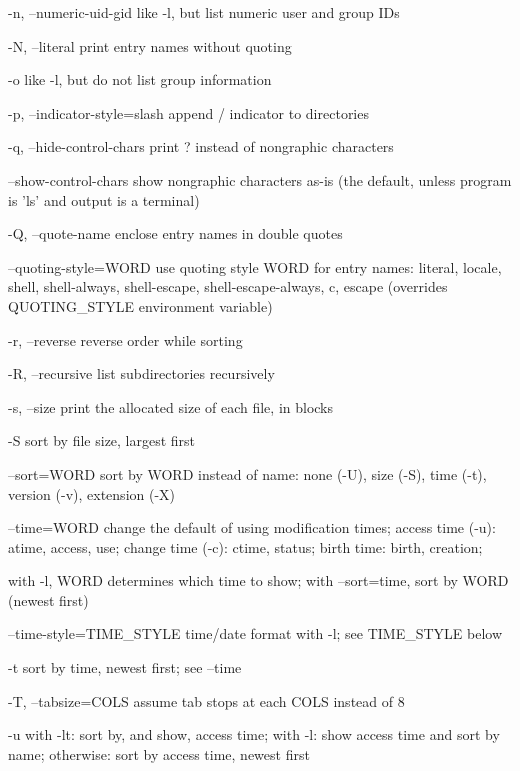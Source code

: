 \documentclass{article}
\begin{document}
       -n, --numeric-uid-gid
              like -l, but list numeric user and group IDs

       -N, --literal
              print entry names without quoting

       -o     like -l, but do not list group information

       -p, --indicator-style=slash
              append / indicator to directories

       -q, --hide-control-chars
              print ? instead of nongraphic characters

       --show-control-chars
              show nongraphic characters as-is (the default, unless program is
              'ls' and output is a terminal)

       -Q, --quote-name
              enclose entry names in double quotes

       --quoting-style=WORD
              use  quoting style WORD for entry names: literal, locale, shell,
              shell-always,  shell-escape,  shell-escape-always,   c,   escape
              (overrides QUOTING_STYLE environment variable)

       -r, --reverse
              reverse order while sorting

       -R, --recursive
              list subdirectories recursively

       -s, --size
              print the allocated size of each file, in blocks

       -S     sort by file size, largest first

       --sort=WORD
              sort  by  WORD instead of name: none (-U), size (-S), time (-t),
              version (-v), extension (-X)

       --time=WORD
              change the default of  using  modification  times;  access  time
              (-u): atime, access, use; change time (-c): ctime, status; birth
              time: birth, creation;

              with -l, WORD determines which time to show;  with  --sort=time,
              sort by WORD (newest first)

       --time-style=TIME_STYLE
              time/date format with -l; see TIME_STYLE below

       -t     sort by time, newest first; see --time

       -T, --tabsize=COLS
              assume tab stops at each COLS instead of 8

       -u     with  -lt:  sort by, and show, access time; with -l: show access
              time and sort by name; otherwise: sort by  access  time,  newest
              first
\end{document}
